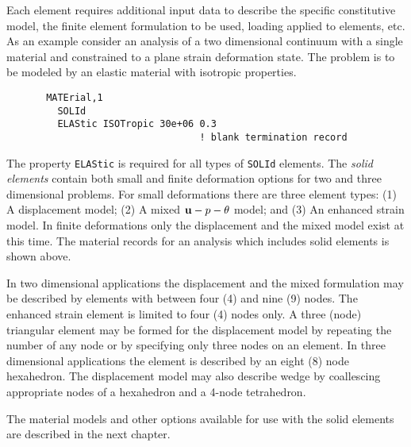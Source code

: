 Each element requires additional input data to describe the
specific constitutive model, the finite element formulation to be used,
loading applied to elements, etc.
As an example consider an analysis of a two dimensional
continuum with a single material and constrained to a plane strain
deformation state.  The problem is to be modeled by an elastic
material with isotropic properties.
\begin{verbatim}
       MATErial,1
         SOLId
         ELAStic ISOTropic 30e+06 0.3
                                  ! blank termination record
\end{verbatim}

The property \texttt{ELAStic} is required for all types of \texttt{SOLId} elements.
The {\it solid elements} contain both small and finite deformation options for
two and three dimensional problems.  For small deformations there are three
element types: (1) A displacement model; (2) A mixed $\mathbf{u}-p-\theta$ model;
and (3) An enhanced strain model.  In finite deformations only the displacement
and the mixed model exist at this time.  The material records for an
analysis which includes solid elements is shown above.

In two dimensional applications
the displacement and the mixed formulation may be described by elements
with between four (4) and nine (9) nodes.  The enhanced strain element
is limited to four (4) nodes only.  A three (node) triangular element
may be formed for the displacement model by repeating the number of any
node or by specifying only three nodes on an element.
In three dimensional applications the element is described by an eight (8)
node hexahedron.  The displacement model may also describe wedge
by coallescing appropriate nodes of a hexahedron and a 4-node tetrahedron.

The material models and other options
available for use with the solid elements are described in the next chapter.

